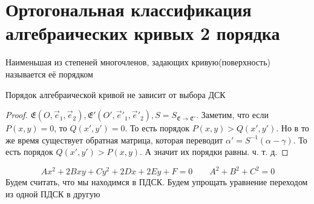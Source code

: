 \section{Ортогональная классификация алгебраических кривых 2 порядка}
\begin{definition}
	Наименьшая из степеней многочленов, задающих кривую(поверхность) называется её порядком
\end{definition}

\begin{proposition}
	Порядок алгебраической кривой не зависит от выбора ДСК
\end{proposition}
\begin{proof}
	\(\mathfrak{E}(O, \vec e_1, \vec e_2), \mathfrak{E}'(O', \vec e'_1, \vec e'_2), S = S_{\mathfrak{E}\longrightarrow\mathfrak{E}'}\). Заметим, что если \(P(x,y) = 0\), то \(Q(x', y') = 0\). То есть порядок \(P(x,y) > Q(x', y')\). Но в то же время существует обратная матрица, которая переводит \(\alpha' = S^{-1}(\alpha-\gamma)\). То есть порядок \(Q(x', y') > P(x, y)\). А значит их порядки равны. ч. т. д.
\end{proof}
\[Ax^2+2Bxy+Cy^2+2Dx+2Ey+F = 0 \qquad A^2 + B^2 + C^2 = 0 \]
Будем считать, что мы находимся в ПДСК. \newline
Будем упрощать уравнение переходом из одной ПДСК в другую
